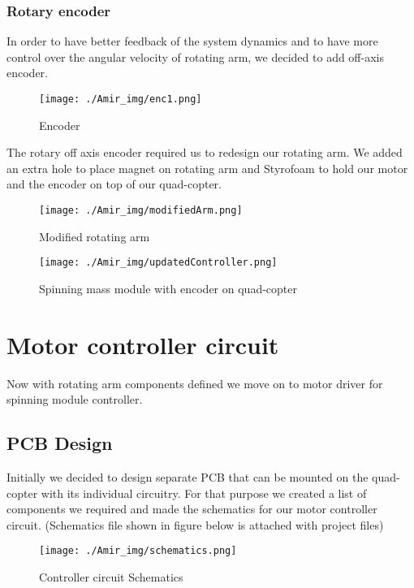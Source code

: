 \subsubsection{Rotary encoder }

In order to have better feedback of the system dynamics and to have more control over the angular velocity of rotating arm, we decided to add off-axis encoder.
\begin{figure}[H]
\centering
\texttt{[image: ./Amir\_img/enc1.png]}
\caption{Encoder}
\end{figure}

The rotary off axis encoder required us to redesign our rotating arm. We added an extra hole to place magnet on rotating arm and Styrofoam to hold our motor and the encoder on top of our quad-copter. 
\begin{center}
\begin{figure}[H]
\centering
\texttt{[image: ./Amir\_img/modifiedArm.png]}
\caption{Modified rotating arm}
\end{figure}


\begin{figure}[H]
\centering
\texttt{[image: ./Amir\_img/updatedController.png]}
\caption{Spinning mass module with encoder on quad-copter}
\end{figure}
\end{center}





\section{Motor controller circuit}
Now with rotating arm components defined we move on to motor driver for spinning module controller. 
\subsection{PCB Design}
Initially we decided to design separate PCB that can be mounted on the quad-copter with its individual circuitry. For that purpose we created a list of components we required and made the schematics for our motor controller circuit. (Schematics file shown in figure below is attached with project files)
\newline

\begin{figure}[H]
\centering
\texttt{[image: ./Amir\_img/schematics.png]}
\caption{Controller circuit Schematics}
\end{figure}

